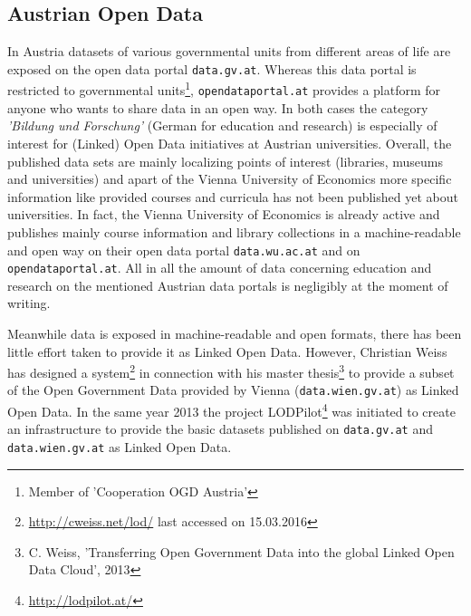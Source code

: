 \newpage

\subsection{Austrian Open Data}
\label{related-work:austrian-open-data}
In Austria datasets of various governmental units from different areas of life are exposed on the open data portal \texttt{data.gv.at}. Whereas this data portal is restricted to governmental units\footnote{Member of 'Cooperation OGD Austria'}, \texttt{opendataportal.at} provides a platform for anyone who wants to share data in an open way. In both cases the category \textit{'Bildung und Forschung'} (German for education and research) is especially of interest for (Linked) Open Data initiatives at Austrian universities. Overall, the published data sets are mainly localizing points of interest (libraries, museums and universities) and apart of the Vienna University of Economics more specific information like provided courses and curricula has not been published yet about universities. In fact, the Vienna University of Economics is already active and publishes mainly course information and library collections in a machine-readable and open way on their open data portal \texttt{data.wu.ac.at} and on \texttt{opendataportal.at}. All in all the amount of data concerning education and research on the mentioned Austrian data portals is negligibly at the moment of writing.

Meanwhile data is exposed in machine-readable and open formats, there has been little effort taken to provide it as Linked Open Data. However, Christian Weiss has designed a system\footnote{\url{http://cweiss.net/lod/} last accessed on 15.03.2016} in connection with his master thesis\footnote{C. Weiss, 'Transferring Open Government Data into the global Linked Open Data Cloud', 2013} to provide a subset of the Open Government Data provided by Vienna (\texttt{data.wien.gv.at}) as Linked Open Data. In the same year 2013 the project LODPilot\footnote{\url{http://lodpilot.at/}} was initiated to create an infrastructure to provide the basic datasets published on \texttt{data.gv.at} and \texttt{data.wien.gv.at} as Linked Open Data.

